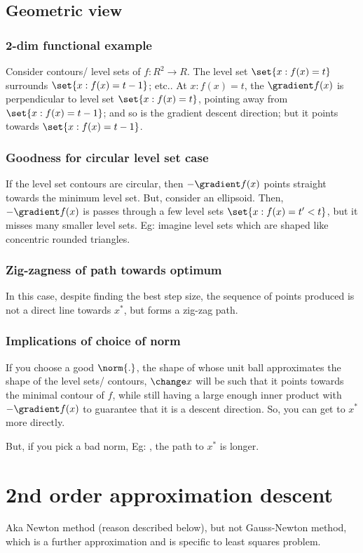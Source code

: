 \documentclass[oneside, article]{memoir}
\begin{document}
\subsection{Geometric view}
\subsubsection{2-dim functional example}
Consider contours/ level sets of $f:R^{2} \to R$. The level set $\set{x:f(x) = t}$ surrounds $\set{x:f(x) = t-1}$; etc.. At $x: f(x) = t$, the $\gradient f(x)$ is perpendicular to level set $\set{x:f(x) = t}$, pointing away from $\set{x:f(x) = t-1}$; and so is the gradient descent direction; but it points towards $\set{x:f(x) = t-1}$.

\subsubsection{Goodness for circular level set case}
If the level set contours are circular, then $-\gradient f(x)$ points straight towards the minimum level set. But, consider an ellipsoid. Then, $-\gradient f(x)$ is passes through a few level sets $\set{x:f(x) = t' < t}$, but it misses many smaller level sets. Eg: imagine level sets which are shaped like concentric rounded triangles.

\subsubsection{Zig-zagness of path towards optimum}
In this case, despite finding the best step size, the sequence of points produced is not a direct line towards $x^{*}$, but forms a zig-zag path.

\subsubsection{Implications of choice of norm}
If you choose a good $\norm{.}$, the shape of whose unit ball approximates the shape of the level sets/ contours, $\change x$ will be such that it points towards the minimal contour of $f$, while still having a large enough inner product with $-\gradient f(x)$ to guarantee that it is a descent direction. So, you can get to $x^{*}$ more directly.

But, if you pick a bad norm, Eg: , the path to $x^{*}$ is longer.

\section{2nd order approximation descent}
Aka Newton method (reason described below), but not Gauss-Newton method, which is a further approximation and is specific to least squares problem.
\end{document}
